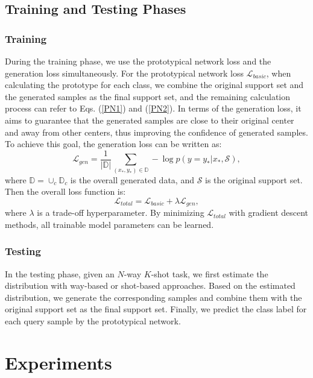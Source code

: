 \documentclass[letterpaper]{article} %
\begin{document}
\subsection{Training and Testing Phases}
\subsubsection{Training}
During the training phase, we use the prototypical network loss and the generation loss simultaneously. For the prototypical network loss $\mathcal{L}_{basic}$, when calculating the prototype for each class, we combine the original support set and the generated samples as the final support set, and the remaining calculation process can refer to Eqs. (\ref{PN1}) and (\ref{PN2}). In terms of the generation loss, it aims to guarantee that the generated samples are close to their original center and away from other centers, thus improving the confidence of generated samples. To achieve this goal, the generation loss can be written as:
\begin{equation}
	\mathcal{L}_{gen} = \frac{1}{|\mathbb{D}|} \sum_{(x_*, y_*) \in \mathbb{D}} - \log p( y = y_* | x_*, \mathcal{S}),
\end{equation}
where $\mathbb{D} =  \cup_{c} \mathbb{D}_c$ is the overall generated data, and $\mathcal{S}$ is the original support set. Then the overall loss function is:
\begin{equation}
	\mathcal{L}_{total} = \mathcal{L}_{basic}+ \lambda \mathcal{L}_{gen},
\end{equation}
where $\lambda$ is a trade-off hyperparameter. By minimizing $\mathcal{L}_{total}$ with gradient descent methods, all trainable model parameters can be learned.
\subsubsection{Testing}
In the testing phase, given an $N$-way $K$-shot task, we first estimate the distribution with way-based or shot-based approaches. Based on the estimated distribution, we generate the corresponding samples and combine them with the original support set as the final support set. Finally, we predict the class label for each query sample by the prototypical network.

\section{Experiments}
\end{document}
